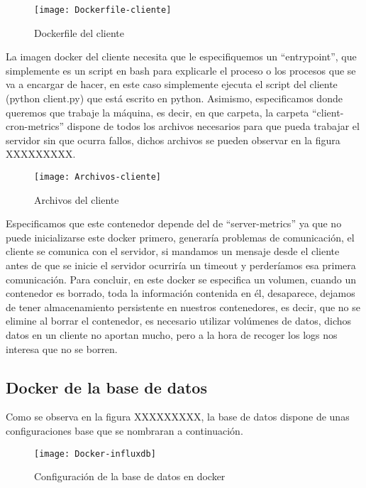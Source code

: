 \documentclass[ spanish, a4paper, 12pt, oneside]{report}
\begin{document}
\begin{figure}[!h]
   \centering
   \texttt{[image: Dockerfile-cliente]}\\
      \caption{\label{fig: Dockerfile del cliente} Dockerfile del cliente}
\end{figure}

La imagen docker del cliente necesita que le especifiquemos un ``entrypoint'', que simplemente es un script en bash para explicarle el proceso o los procesos que se va a encargar de hacer, en este caso simplemente ejecuta el script del cliente (python client.py) que está 
escrito en python. Asimismo, especificamos donde queremos que trabaje la máquina, es decir, en que carpeta, la carpeta ``client-cron-metrics'' dispone de todos los archivos necesarios para que pueda trabajar el servidor sin que ocurra fallos, dichos archivos se pueden observar en la figura XXXXXXXXX.\\

\begin{figure}[!h]
   \centering
   \texttt{[image: Archivos-cliente]}\\
      \caption{\label{fig: Archivos del cliente} Archivos del cliente}
\end{figure}

Especificamos que este contenedor depende del de ``server-metrics'' ya que no puede inicializarse este docker primero, generaría problemas de comunicación, el cliente se comunica con el servidor, si mandamos un mensaje desde el cliente antes de que se inicie el servidor ocurriría un timeout y perderíamos esa primera comunicación. 
Para concluir, en este docker se especifica un volumen, cuando un contenedor es borrado, toda la información contenida en él, desaparece, dejamos de tener almacenamiento persistente en nuestros contenedores, es decir, que no se elimine al borrar el contenedor, es necesario utilizar volúmenes de datos, 
dichos datos en un cliente no aportan mucho, pero a la hora de recoger los logs nos interesa que no se borren.\\

\subsection{Docker de la base de datos}
Como se observa en la figura XXXXXXXXX, la base de datos dispone de unas configuraciones base que se nombraran a continuación.\\

\begin{figure}[!h]
   \centering
   \texttt{[image: Docker-influxdb]}\\
      \caption{\label{fig: Configuración de la base de datos en docker} Configuración de la base de datos en docker}
\end{figure}
\end{document}

